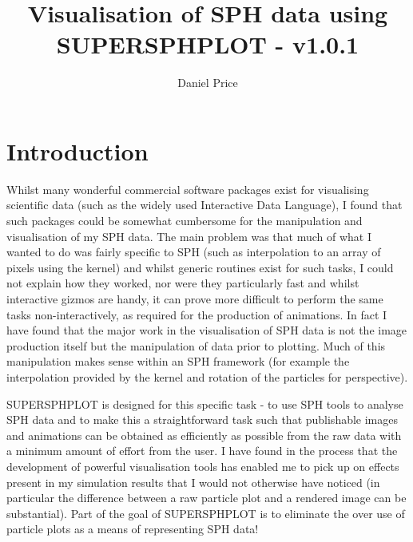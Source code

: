 \documentclass[a4paper,12pt]{article}
\title{Visualisation of SPH data using SUPERSPHPLOT - v1.0.1}
\author{Daniel Price}
\begin{document}
\maketitle
\tableofcontents

\newpage
\section{Introduction}
 Whilst many wonderful commercial software packages exist for visualising scientific
data (such as the widely used Interactive Data Language), I found that such packages
could be somewhat cumbersome for the manipulation and visualisation of my SPH data. The
main problem was that much of what I wanted to do was fairly specific to SPH (such as
interpolation to an array of pixels using the kernel) and whilst generic routines exist
for such tasks, I could not explain how they worked, nor were they
particularly fast and whilst interactive gizmos are handy, it can prove more difficult to perform the
same tasks non-interactively, as required for the production of animations. 
In fact I have found that the major
work in the visualisation of SPH data is not the image production itself but the
manipulation of data prior to plotting. Much of this manipulation makes sense
within an SPH framework (for example the interpolation provided by the kernel
and rotation of the particles for perspective).

 SUPERSPHPLOT is designed for this specific task - to use SPH tools to analyse SPH data and to make this a
straightforward task such that publishable images and animations can be obtained
as efficiently as possible from the raw data with a minimum amount of effort
from the user. I have found in the process that the development of powerful
visualisation tools has enabled me to pick up on effects present in my
simulation results that I would not otherwise have noticed (in particular the
difference between a raw particle plot and a rendered image can be substantial). Part of the goal of SUPERSPHPLOT is to eliminate the over use of particle plots as a means of representing SPH data!
\end{document}
